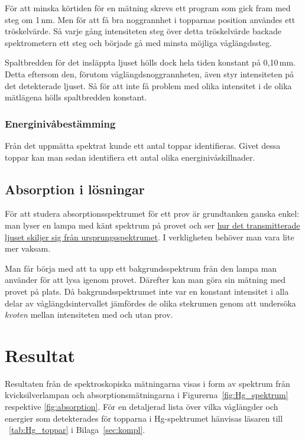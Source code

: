 \documentclass[11pt,a4paper]{article}
\newcommand{\tabref}{\tablename~\ref} %
\begin{document}
För att minska körtiden för en mätning skrevs ett program som gick
fram med steg om 1\,nm. Men för att få bra noggrannhet i topparnas
position användes ett tröskelvärde. Så varje gång intensiteten steg
över detta tröskelvärde backade spektrometern ett steg och började gå
med minsta möjliga våglängdssteg. 

Spaltbredden för det insläppta ljuset hölls dock hela tiden
konstant på 0,10\,mm. Detta eftersom den, förutom
våglängdsnoggrannheten, även styr intensiteten på det detekterade
ljuset. Så för att inte få problem med olika intensitet i de olika
mätlägena hölls spaltbredden konstant. 

\subsubsection{Energinivåbestämming}
Från det uppmätta spektrat kunde ett antal toppar identifieras. Givet
dessa toppar kan man sedan identifiera ett antal olika
energinivåskillnader. 

\subsection{Absorption i lösningar}

För att studera absorptionsspektrumet för ett prov är grundtanken
ganska enkel: man lyser en lampa med känt spektrum på provet och ser
\href{https://xkcd.com/1517/}{hur det transmitterade ljuset skiljer
  sig från ursprungsspektrumet}. I verkligheten behöver man vara lite
mer vaksam. 

Man får börja med att ta upp ett bakgrundsspektrum från den lampa man
använder för att lysa igenom provet. Därefter kan man göra sin mätning
med provet på plats. Då bakgrundsspektrumet inte var en konstant
intensitet i alla delar av våglängdsintervallet jämfördes de olika
stekrumen genom att undersöka \emph{kvoten} mellan intensiteten med
och utan prov. 


\section{Resultat}
Resultaten från de spektroskopiska mätningarna visas i form av
spektrum från kvicksilverlampan och absorptionsmätningarna i
Figurerna~\ref{fig:Hg_spektrum} respektive \ref{fig:absorption}.
För en detaljerad lista över vilka våglängder och energier som
detekterades för topparna i Hg-spektrumet hänvisas läsaren till
\tabref{tab:Hg_toppar} i Bilaga~\ref{sec:kompl}.  
\end{document}
